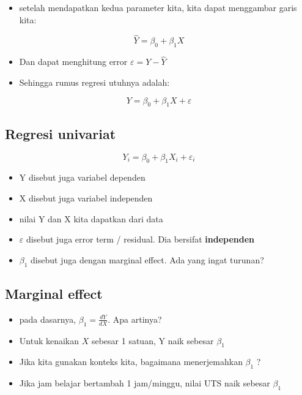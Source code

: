 \documentclass[
  letterpaper,
  DIV=11,
  numbers=noendperiod]{scrartcl}
\providecommand{\tightlist}{%
  \setlength{\itemsep}{0pt}\setlength{\parskip}{0pt}}\usepackage{longtable,booktabs,array}
\begin{document}
\begin{itemize}
\tightlist
\item
  setelah mendapatkan kedua parameter kita, kita dapat menggambar garis
  kita:
\end{itemize}

\[
\hat{Y}=\beta_0+\beta_1 X
\]

\begin{itemize}
\item
  Dan dapat menghitung error \(\varepsilon=Y-\hat{Y}\)
\item
  Sehingga rumus regresi utuhnya adalah:
\end{itemize}

\[
Y=\beta_0+\beta_1 X + \varepsilon
\]

\hypertarget{regresi-univariat}{%
\subsection{Regresi univariat}\label{regresi-univariat}}

\[
Y_i=\beta_0+\beta_1 X_i+\varepsilon_i
\]

\begin{itemize}
\item
  Y disebut juga variabel dependen
\item
  X disebut juga variabel independen
\item
  nilai Y dan X kita dapatkan dari data
\item
  \(\varepsilon\) disebut juga error term / residual. Dia bersifat
  \textbf{independen}
\item
  \(\beta_1\) disebut juga dengan marginal effect. Ada yang ingat
  turunan?
\end{itemize}

\hypertarget{marginal-effect-2}{%
\subsection{Marginal effect}\label{marginal-effect-2}}

\begin{itemize}
\item
  pada dasarnya, \(\beta_1=\frac{dY}{dX}\). Apa artinya?
\item
  Untuk kenaikan \(X\) sebesar 1 satuan, Y naik sebesar \(\beta_1\)
\item
  Jika kita gunakan konteks kita, bagaimana menerjemahkan \(\beta_1\) ?
\item
  Jika jam belajar bertambah 1 jam/minggu, nilai UTS naik sebesar
  \(\beta_1\)
\end{itemize}
\end{document}
